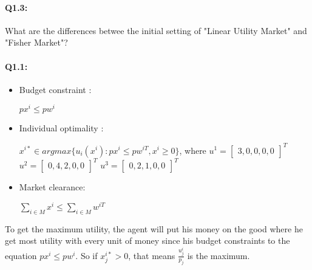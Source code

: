 \documentclass{article}
\newenvironment{answer}{\par\color{ForestGreen}}{\par}
\begin{document}
\paragraph{Q1.3:}
What are the differences betwee the initial setting of "Linear Utility Market" and "Fisher Market"?
\begin{answer}
  \paragraph{Q1.1:}
  \begin{itemize}
    \item Budget constraint :

    $px^i \leq pw^i $
    \item Individual optimality :

    $x^{i*} \in argmax \{u_i(x^i) : px^i \leq pw^{iT},x^i \geq 0 \}$,
    where
    $u^1 = \begin{bmatrix} 3, 0, 0, 0, 0 \end{bmatrix}^T$
    $u^2 = \begin{bmatrix} 0, 4, 2, 0, 0 \end{bmatrix}^T$
    $u^3 = \begin{bmatrix} 0, 2, 1, 0, 0 \end{bmatrix}^T$

    \item Market clearance:

    $\sum_{i\in M} x^i \leq \sum_{i\in M} w^{iT}$
  \end{itemize}

  To get the maximum utility, the agent will put his money on the good where he get most utility with every unit of money since his budget constraints to the equation $px^i \leq pw^i $. So if $x_j^{i*} >0$, that means $\frac{u_j^i}{p_j}$ is the maximum.


\end{answer}
\end{document}
